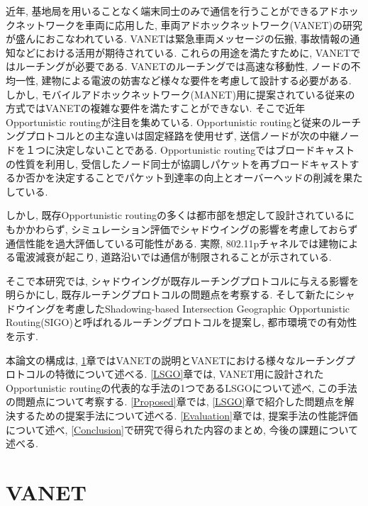\documentclass[10pt]{jreport}
\begin{document}
近年, 基地局を用いることなく端末同士のみで通信を行うことができるアドホックネットワークを車両に応用した, 車両アドホックネットワーク(VANET)の研究が盛んにおこなわれている. VANETは緊急車両メッセージの伝搬, 事故情報の通知などにおける活用が期待されている. これらの用途を満たすために, VANETではルーチングが必要である. VANETのルーチングでは高速な移動性, ノードの不均一性, 建物による電波の妨害など様々な要件を考慮して設計する必要がある. しかし, モバイルアドホックネットワーク(MANET)用に提案されている従来の方式\cite {3,4,5}ではVANETの複雑な要件を満たすことができない. そこで近年Opportunistic routing\cite{16}が注目を集めている. Opportunistic routingと従来のルーチングプロトコルとの主な違いは固定経路を使用せず, 送信ノードが次の中継ノードを１つに決定しないことである. Opportunistic routingではブロードキャストの性質を利用し, 受信したノード同士が協調しパケットを再ブロードキャストするか否かを決定することでパケット到達率の向上とオーバーヘッドの削減を果たしている. 

しかし, 既存Opportunistic routingの多くは都市部を想定して設計されているにもかかわらず, シミュレーション評価でシャドウイングの影響を考慮しておらず通信性能を過大評価している可能性がある. 実際, 802.11pチャネルでは建物による電波減衰が起こり, 道路沿いでは通信が制限されることが示されている\cite{17}. 

そこで本研究では, シャドウイングが既存ルーチングプロトコルに与える影響を明らかにし, 既存ルーチングプロトコルの問題点を考察する.
そして新たにシャドウイングを考慮したShadowing-based Intersection Geographic Opportunistic Routing(SIGO)と呼ばれるルーチングプロトコルを提案し, 都市環境での有効性を示す. 

本論文の構成は, \ref{Related}章ではVANETの説明とVANETにおける様々なルーチングプロトコルの特徴について述べる. \ref{LSGO}章では, VANET用に設計されたOpportunistic routingの代表的な手法の1つであるLSGOについて述べ, この手法の問題点について考察する. \ref{Proposed}章では, \ref{LSGO}章で紹介した問題点を解決するための提案手法について述べる. \ref{Evaluation}章では, 提案手法の性能評価について述べ, \ref{Conclusion}で研究で得られた内容のまとめ, 今後の課題について述べる. 



\chapter{VANET}
\label{Related}
\vspace{-5mm}
\end{document}
